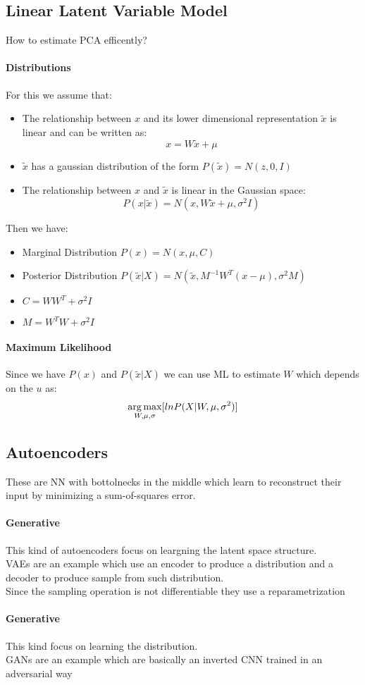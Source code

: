 \subsection{Linear Latent Variable Model}
How to estimate PCA efficently?

\paragraph{Distributions}
For this we assume that:
\begin{itemize}
\item The relationship between $x$ and its lower dimensional representation $\tilde{x}$ is linear and can be written as:
$$x=W\tilde{x}+\mu$$
\item $\tilde{x}$ has a gaussian distribution of the form $P(\tilde{x})=N(z,0,I)$
\item The relationship between $x$ and $\tilde{x}$ is linear in the Gaussian space:
$$P(x|\tilde{x})=N(x,W\tilde{x}+\mu,\sigma^2 I)$$
\end{itemize}

Then we have:
\begin{itemize}
\item Marginal Distribution $P(x)=N(x, \mu, C)$
\item Posterior Distribution $P(\tilde{x}|X)=N(\tilde{x},M^{-1}W^T(x-\mu),\sigma^2 M)$
\item $C=WW^T+\sigma^2I$
\item $M=W^TW+\sigma^2I$
\end{itemize}

\paragraph{Maximum Likelihood}
Since we have $P(x)$ and $P(\tilde{x}|X)$ we can use ML to estimate $W$ which depends on the $u$ as:
$$\operatorname*{arg\,max}_{W,\mu,\sigma}[ln P(X|W,\mu,\sigma^2)]$$

\subsection{Autoencoders}

These are NN with bottolnecks in the middle which learn to reconstruct their input by minimizing a sum-of-squares error.

\paragraph{Generative}
This kind of autoencoders focus on leargning the latent space structure.\\
VAEs are an example which use an encoder to produce  a distribution and a decoder to produce sample from such distribution.\\
Since the sampling operation is not differentiable they use a reparametrization 

\paragraph{Generative}
This kind focus on learning the distribution.\\
GANs are an example which are basically an inverted CNN trained in an adversarial way 